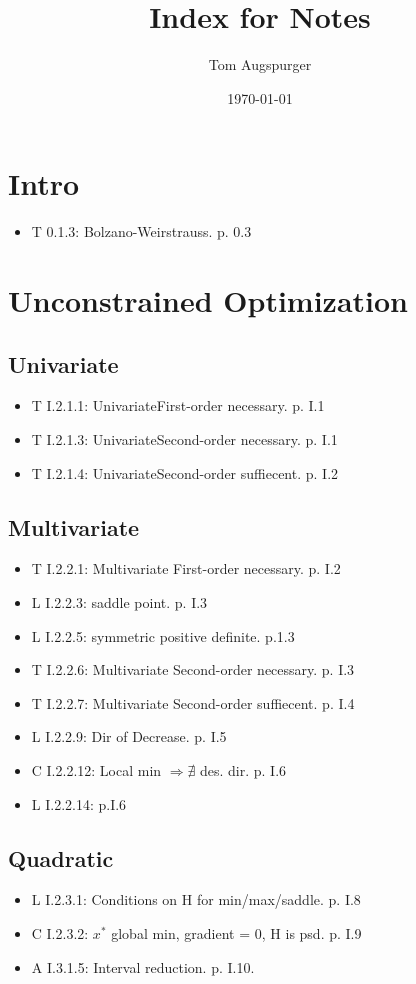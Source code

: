 \documentclass[11pt]{article}
\title{Index for Notes}
\author{Tom Augspurger}
\date{\today}
\begin{document}
\fontsize{8}{.5}\selectfont


\section{Intro}
\label{sec:intro}
\begin{itemize}
    \item T 0.1.3: Bolzano-Weirstrauss. p. 0.3
\end{itemize}

\section{Unconstrained Optimization}
\label{sec:unconstrained_optimization}
\subsection{Univariate}
\label{sub:univariate}
  \begin{itemize}
    \item T I.2.1.1: UnivariateFirst-order necessary. p. I.1
    \item T I.2.1.3: UnivariateSecond-order necessary. p. I.1
    \item T I.2.1.4: UnivariateSecond-order suffiecent. p. I.2
  \end{itemize}

\subsection{Multivariate}
\label{sub:multivariate}
  \begin{itemize}
    \item T I.2.2.1: Multivariate First-order necessary. p. I.2
    \item L I.2.2.3: saddle point. p. I.3
    \item L I.2.2.5: symmetric positive definite. p.1.3
    \item T I.2.2.6: Multivariate Second-order necessary. p. I.3
    \item T I.2.2.7: Multivariate Second-order suffiecent. p. I.4
    \item L I.2.2.9: Dir of Decrease. p. I.5
    \item C I.2.2.12: Local min $\Rightarrow \nexists$ des. dir. p. I.6
    \item L I.2.2.14: p.I.6
  \end{itemize}

\subsection{Quadratic}
\label{sub:quadratic}
  \begin{itemize}
    \item L I.2.3.1: Conditions on H for min/max/saddle. p. I.8
    \item C I.2.3.2: $x^*$ global min, gradient = 0, H is psd. p. I.9
    \item A I.3.1.5: Interval reduction. p. I.10.
  \end{itemize}
\end{document}
